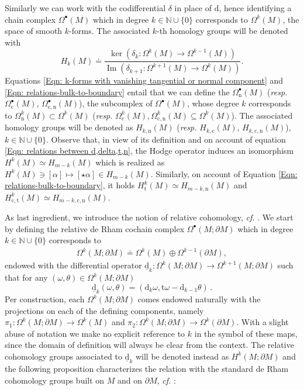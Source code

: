 Similarly we can work with the codifferential $\delta$ in place of $\mathrm{d}$, hence identifying a chain complex $\Omega^\bullet(M)$ which in degree  $k\in\mathbb{N}\cup\{0\}$ corresponds to $\Omega^k(M)$, the space of smooth $k$-forms. The associated $k$-th homology groups will be denoted with 
$$H_k(M)\doteq\frac{\ker (\delta_k\colon\Omega^k(M)\to\Omega^{k-1}(M))}{\operatorname{Im} (\delta_{k+1}\colon\Omega^{k+1}(M)\to\Omega^k(M))}.$$
Equations \eqref{Eqn: k-forms with vanishing tangential or normal component} and \eqref{Eqn: relations-bulk-to-boundary} entail that we can define the $\Omega^\bullet_{\mathrm{n}}(M)$ (\textit{resp.} $\Omega^\bullet_{\mathrm{c}}(M)$, $\Omega^\bullet_{\mathrm{c,n}}(M)$), the subcomplex of $\Omega^\bullet(M)$, whose degree $k$ corresponds to $\Omega^k_{\mathrm{n}}(M)\subset\Omega^k(M)$ (\textit{resp.} $\Omega^k_{\mathrm{c}}(M),\Omega^k_{\mathrm{c,n}}(M)\subseteq\Omega^k(M)$).
The associated homology groups will be denoted as $H_{k,\mathrm{n}}(M)$ (\textit{resp.} $H_{k,\mathrm{c}}(M)$, $H_{k,\mathrm{c,n}}(M)$), $k\in\mathbb{N}\cup\{0\}$.
Observe that, in view of its definition and on account of equation \eqref{Eqn: relations between d,delta,t,n}, the Hodge operator induces an isomorphism $H^k(M)\simeq H_{m-k}(M)$ which is realized as $H^k(M)\ni[\alpha]\mapsto [\star\alpha]\in H_{m-k}(M)$. Similarly, on account of Equation \eqref{Eqn: relations-bulk-to-boundary}, it holds $H^k_{\mathrm{t}}(M)\simeq H_{m-k,\mathrm{n}}(M)$ and $H^k_{\mathrm{c,t}}(M)\simeq H_{m-k,\mathrm{c,n}}(M)$.

As last ingredient, we introduce the notion of relative cohomology, {\it cf.} \cite{Bott-Tu-82}. We start by defining the relative de Rham cochain complex $\Omega^\bullet(M;\partial M)$  which in degree  $k\in\mathbb{N}\cup\{0\}$ corresponds to 
\begin{align*}
\Omega^k(M;\partial M)\doteq \Omega^k(M)\oplus\Omega^{k-1}(\partial M),
\end{align*}
endowed with the differential operator $\underline{\mathrm{d}}_k:\Omega^k(M;\partial M)\to\Omega^{k+1}(M;\partial M)$ such that for any $(\omega,\theta)\in\Omega^k(M;\partial M)$
\begin{equation}\label{Eq: relative-differential}
\underline{\mathrm{d}}_k(\omega,\theta)=(\mathrm{d}_k\omega,\mathrm{t}\omega-\mathrm{d}_{k-1}\theta)\,.
\end{equation}
Per construction, each $\Omega^k(M;\partial M)$ comes endowed naturally with the projections on each of the defining components, namely $\pi_1:\Omega^k(M;\partial M)\to\Omega^k(M)$ and $\pi_2:\Omega^k(M;\partial M)\to\Omega^k(\partial M)$. With a slight abuse of notation we make no explicit reference to $k$ in the symbol of these maps, since the domain of definition will always be clear from the context. The relative cohomology groups associated to $\underline{\mathrm{d}}_k$ will be denoted instead as $H^k(M;\partial M)$ and the following proposition characterizes the relation with the standard de Rham cohomology groups built on $M$ and on $\partial M$, {\it cf.} \cite[Prop. 6.49]{Bott-Tu-82}:

